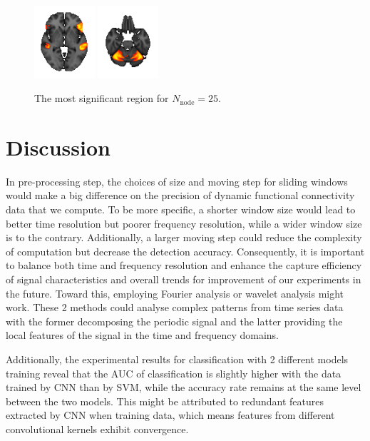 \documentclass[11pt]{article}
\begin{document}
\begin{figure}[H]
    \includegraphics[width=0.2\textwidth]{../Analysis/MIR/groupICA/groupICA_3T_HCP1200_MSMAll_d25.ica/0017.png}
    \includegraphics[width=0.2\textwidth]{../Analysis/MIR/groupICA/groupICA_3T_HCP1200_MSMAll_d25.ica/0021.png}
    \caption{The most significant region for $N_{\text{node}} = 25$.}
    \label{msr-n-25}
\end{figure}

\section{Discussion}

In pre-processing step, the choices of size and moving step for sliding windows would make a big difference on the precision of dynamic functional connectivity data that we compute. To be more specific, a shorter window size would lead to better time resolution but poorer frequency resolution, while a wider window size is to the contrary\cite{Leiber2023-de}. Additionally, a larger moving step could reduce the complexity of computation but decrease the detection accuracy\cite{jiang2015flexible}. Consequently, it is important to balance both time and frequency resolution and enhance the capture efficiency of signal characteristics and overall trends for improvement of our experiments in the future. Toward this, employing Fourier analysis\cite{Mantini2007-sv} or wavelet analysis\cite{Medda2016-vh} might work. These 2 methods could analyse complex patterns from time series data with the former decomposing the periodic signal and the latter providing the local features of the signal in the time and frequency domains\cite{Guo2022-dk}.

Additionally, the experimental results for classification with 2 different models training reveal that the AUC of classification is slightly higher with the data trained by CNN than by SVM, while the accuracy rate remains at the same level between the two models. This might be attributed to redundant features extracted by CNN when training data, which means features from different convolutional kernels exhibit convergence.
\end{document}
